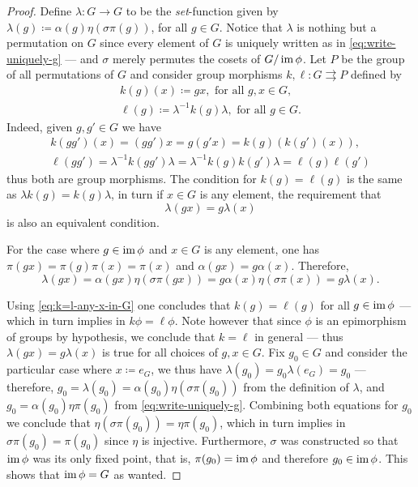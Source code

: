 \begin{proof}
    Define \(\lambda: G \to G\) to be the \emph{set}-function given by
    \(\lambda(g) \coloneq \alpha(g) \eta (\sigma \pi(g))\), for all \(g \in
    G\). Notice that \(\lambda\) is nothing but a permutation on \(G\) since every
    element of \(G\) is uniquely written as in \cref{eq:write-uniquely-g} --- and
    \(\sigma\) merely permutes the cosets of \(G/\operatorname{im} \phi\). Let \(P\) be the group
    of all permutations of \(G\) and consider group morphisms
    \(k, \ell: G \rightrightarrows P\) defined by
    \begin{gather}
        \label{gath:k-definition-gx}
        k(g)(x)  \coloneq  g x, \text{ for all } g, x \in G, \\
        \label{gath:ell-definition-g}
        \ell(g) \coloneq \lambda^{-1} k(g) \lambda, \text{ for all } g \in G.
    \end{gather}
    Indeed, given \(g, g' \in G\) we have
    \begin{gather*}
        k(g g')(x) = (g g') x = g (g' x) = k(g)(k(g')(x)), \\
        \ell(g g') = \lambda^{-1} k(g g') \lambda
        = \lambda^{-1} k(g) k(g') \lambda = \ell(g) \ell(g')
    \end{gather*}
    thus both are group morphisms. The condition for \(k(g) = \ell(g)\) is the same
    as \(\lambda k(g) = k(g) \lambda\), in turn if \(x \in G\) is any element,
    the requirement that
    \begin{equation}\label{eq:k=l-any-x-in-G}
        \lambda(g x) = g \lambda(x)
    \end{equation}
    is also an equivalent condition.

    For the case where \(g \in \operatorname{im} \phi\) and \(x \in G\) is any element, one has
    \(\pi(g x) = \pi(g) \pi(x) = \pi(x)\) and \(\alpha(g x) = g
    \alpha(x)\). Therefore,
    \[
        \lambda(g x)
        = \alpha(g x) \eta(\sigma \pi(g x))
        = g \alpha(x) \eta(\sigma \pi(x))
        = g \lambda(x).
    \]


    Using \cref{eq:k=l-any-x-in-G} one concludes that \(k(g) = \ell(g)\) for all
    \(g \in \operatorname{im} \phi\) --- which in turn implies in \(k \phi = \ell \phi\). Note
    however that since \(\phi\) is an epimorphism of groups by hypothesis, we
    conclude that \(k = \ell\) in general --- thus \(\lambda(g x) = g \lambda(x)\)
    is true for all choices of \(g, x \in G\). Fix \(g_0 \in G\) and consider the
    particular case where \(x \coloneq e_G\), we thus have
    \(\lambda(g_0) = g_0 \lambda(e_G) = g_0\) --- therefore,
    \(g_0 = \lambda(g_0) = \alpha(g_0) \eta (\sigma \pi(g_0))\) from the definition
    of \(\lambda\), and \(g_0 = \alpha(g_0) \eta \pi(g_0)\) from
    \cref{eq:write-uniquely-g}. Combining both equations for \(g_0\) we conclude
    that \(\eta (\sigma \pi(g_0)) = \eta \pi(g_0)\), which in turn implies in
    \(\sigma \pi(g_0) = \pi(g_0)\) since \(\eta\) is injective. Furthermore,
    \(\sigma\) was constructed so that \(\operatorname{im} \phi\) was its only fixed point, that
    is, \(\pi(g_0) = \operatorname{im} \phi\) and therefore \(g_0 \in \operatorname{im} \phi\). This shows that
    \(\operatorname{im} \phi = G\) as wanted.
\end{proof}

